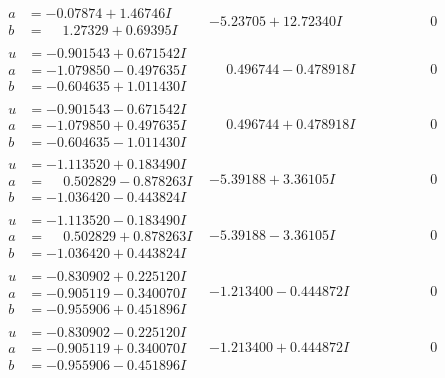 \documentclass[1p]{elsarticle_modified}
\theoremstyle{definition}
\begin{document}
$$\begin{array}{c|c|c}
\begin{aligned}
a &= -0.07874 + 1.46746 I \\
b &= \phantom{-}1.27329 + 0.69395 I\end{aligned}
 & -5.23705 + 12.72340 I & \phantom{-0.000000 } 0 \\ \hline\begin{aligned}
u &= -0.901543 + 0.671542 I \\
a &= -1.079850 - 0.497635 I \\
b &= -0.604635 + 1.011430 I\end{aligned}
 & \phantom{-}0.496744 - 0.478918 I & \phantom{-0.000000 } 0 \\ \hline\begin{aligned}
u &= -0.901543 - 0.671542 I \\
a &= -1.079850 + 0.497635 I \\
b &= -0.604635 - 1.011430 I\end{aligned}
 & \phantom{-}0.496744 + 0.478918 I & \phantom{-0.000000 } 0 \\ \hline\begin{aligned}
u &= -1.113520 + 0.183490 I \\
a &= \phantom{-}0.502829 - 0.878263 I \\
b &= -1.036420 - 0.443824 I\end{aligned}
 & -5.39188 + 3.36105 I & \phantom{-0.000000 } 0 \\ \hline\begin{aligned}
u &= -1.113520 - 0.183490 I \\
a &= \phantom{-}0.502829 + 0.878263 I \\
b &= -1.036420 + 0.443824 I\end{aligned}
 & -5.39188 - 3.36105 I & \phantom{-0.000000 } 0 \\ \hline\begin{aligned}
u &= -0.830902 + 0.225120 I \\
a &= -0.905119 - 0.340070 I \\
b &= -0.955906 + 0.451896 I\end{aligned}
 & -1.213400 - 0.444872 I & \phantom{-0.000000 } 0 \\ \hline\begin{aligned}
u &= -0.830902 - 0.225120 I \\
a &= -0.905119 + 0.340070 I \\
b &= -0.955906 - 0.451896 I\end{aligned}
 & -1.213400 + 0.444872 I & \phantom{-0.000000 } 0 \\ \hline\begin{aligned}

\end{aligned}
\end{array}$$
\end{document}

